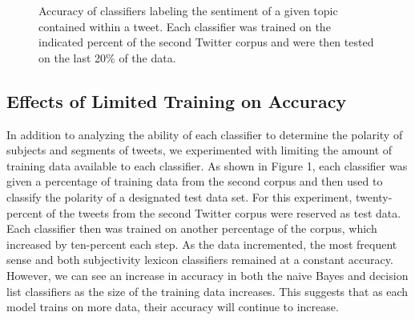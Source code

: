 \documentclass[11pt]{article}
\begin{document}
\begin{figure}[htb!]
  \centering
  \caption{Accuracy of classifiers labeling the sentiment of a given topic contained within a tweet. Each classifier was trained on the indicated percent of the second Twitter corpus and were then tested on the last 20\% of the data.}
\end{figure}

\subsection{Effects of Limited Training on Accuracy}
In addition to analyzing the ability of each classifier to determine the polarity of subjects and segments of tweets, we experimented with limiting the amount of training data available to each classifier. As shown in Figure 1, each classifier was given a percentage of training data from the second corpus and then used to classify the polarity of a designated test data set. For this experiment, twenty-percent of the tweets from the second Twitter corpus were reserved as test data. Each classifier then was trained on another percentage of the corpus, which increased by ten-percent each step. As the data incremented, the most frequent sense and both subjectivity lexicon classifiers remained at a constant accuracy. However, we can see an increase in accuracy in both the naive Bayes and decision list classifiers as the size of the training data increases. This suggests that as each model trains on more data, their accuracy will continue to increase. 
\end{document}
